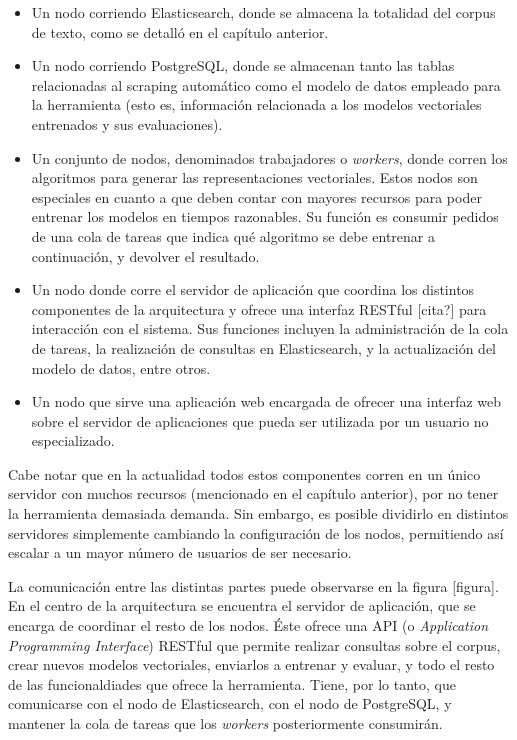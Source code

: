 \begin{itemize}

\item Un nodo corriendo Elasticsearch, donde se almacena la totalidad del corpus de texto, como se
detalló en el capítulo anterior.

\item Un nodo corriendo PostgreSQL, donde se almacenan tanto las tablas relacionadas al scraping
automático como el modelo de datos empleado para la herramienta (esto es, información relacionada a
los modelos vectoriales entrenados y sus evaluaciones).

\item Un conjunto de nodos, denominados trabajadores o \textit{workers}, donde corren los algoritmos
para generar las representaciones vectoriales. Estos nodos son especiales en cuanto a que deben
contar con mayores recursos para poder entrenar los modelos en tiempos razonables. Su función es
consumir pedidos de una cola de tareas que indica qué algoritmo se debe entrenar a continuación, y
devolver el resultado.

\item Un nodo donde corre el servidor de aplicación que coordina los distintos componentes de la
arquitectura y ofrece una interfaz RESTful [cita?] para interacción con el sistema. Sus funciones
incluyen la administración de la cola de tareas, la realización de consultas en Elasticsearch, y la
actualización del modelo de datos, entre otros.

\item Un nodo que sirve una aplicación web encargada de ofrecer una interfaz web sobre el servidor
de aplicaciones que pueda ser utilizada por un usuario no especializado.

\end{itemize}

Cabe notar que en la actualidad todos estos componentes corren en un único servidor con muchos
recursos (mencionado en el capítulo anterior), por no tener la herramienta demasiada demanda. Sin
embargo, es posible dividirlo en distintos servidores simplemente cambiando la configuración de los
nodos, permitiendo así escalar a un mayor número de usuarios de ser necesario.

La comunicación entre las distintas partes puede observarse en la figura [figura]. En el centro de
la arquitectura se encuentra el servidor de aplicación, que se encarga de coordinar el resto de los
nodos. Éste ofrece una API (o \textit{Application Programming Interface}) RESTful que permite
realizar consultas sobre el corpus, crear nuevos modelos vectoriales, enviarlos a entrenar y
evaluar, y todo el resto de las funcionaldiades que ofrece la herramienta. Tiene, por lo tanto, que
comunicarse con el nodo de Elasticsearch, con el nodo de PostgreSQL, y mantener la cola de tareas
que los \textit{workers} posteriormente consumirán.


